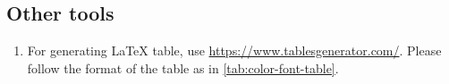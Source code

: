 \subsection*{Other tools}
\begin{enumerate}
    \item For generating \LaTeX\xspace table, use \href{Table Genrator}{https://www.tablesgenerator.com/}. Please follow the format of the table as in \cref{tab:color-font-table}.
\end{enumerate}

